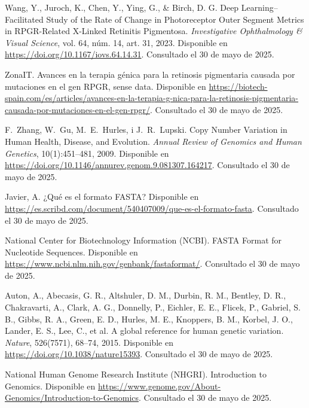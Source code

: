 \documentclass[11pt,spanish,listoffigures,listoftables]{tfgetsinf}
\begin{document}
\begin{thebibliography}{99}
   Wang, Y., Juroch, K., Chen, Y., Ying, G., \& Birch, D. G.  
   \newblock Deep Learning–Facilitated Study of the Rate of Change in Photoreceptor Outer Segment Metrics in RPGR-Related X-Linked Retinitis Pigmentosa.  
   \newblock \textit{Investigative Ophthalmology \& Visual Science}, vol. 64, núm. 14, art. 31, 2023.  
   \newblock Disponible en  
   \url{https://doi.org/10.1167/iovs.64.14.31}.
   \newblock Consultado el 30 de mayo de 2025.

   ZonaIT.  
   \newblock Avances en la terapia génica para la retinosis pigmentaria causada por mutaciones en el gen RPGR,  
   sense data.  
   \newblock Disponible en  
   \url{https://biotech-spain.com/es/articles/avances-en-la-terapia-g-nica-para-la-retinosis-pigmentaria-causada-por-mutaciones-en-el-gen-rpgr/}.
   \newblock Consultado el 30 de mayo de 2025.

   F.~Zhang, W.~Gu, M.~E.~Hurles, i J.~R.~Lupski.
   \newblock Copy Number Variation in Human Health, Disease, and Evolution.
   \newblock \textit{Annual Review of Genomics and Human Genetics}, 10(1):451--481, 2009.
   \newblock Disponible en
   \newblock \url{https://doi.org/10.1146/annurev.genom.9.081307.164217}.
   \newblock Consultado el 30 de mayo de 2025.
   
   Javier, A.  
   \newblock ¿Qué es el formato FASTA?    
   \newblock Disponible en 
   \newblock \url{https://es.scribd.com/document/540407009/que-es-el-formato-fasta}.
   \newblock Consultado el 30 de mayo de 2025.
 
   National Center for Biotechnology Information (NCBI).  
   \newblock FASTA Format for Nucleotide Sequences. 
   \newblock Disponible en 
   \newblock \url{https://www.ncbi.nlm.nih.gov/genbank/fastaformat/}.
   \newblock Consultado el 30 de mayo de 2025.
 
   Auton, A., Abecasis, G. R., Altshuler, D. M., Durbin, R. M., Bentley, D. R., Chakravarti, A., Clark, A. G., Donnelly, P., Eichler, E. E., Flicek, P., Gabriel, S. B., Gibbs, R. A., Green, E. D., Hurles, M. E., Knoppers, B. M., Korbel, J. O., Lander, E. S., Lee, C., et al.  
   \newblock A global reference for human genetic variation.  
   \newblock \textit{Nature}, 526(7571), 68–74, 2015.  
   \newblock Disponible en 
   \newblock \url{https://doi.org/10.1038/nature15393}.
   \newblock Consultado el 30 de mayo de 2025.
   
   National Human Genome Research Institute (NHGRI).  
   \newblock Introduction to Genomics.  
   \newblock Disponible en  
   \newblock \url{https://www.genome.gov/About-Genomics/Introduction-to-Genomics}.
   \newblock Consultado el 30 de mayo de 2025.



\end{thebibliography}
\end{document}
